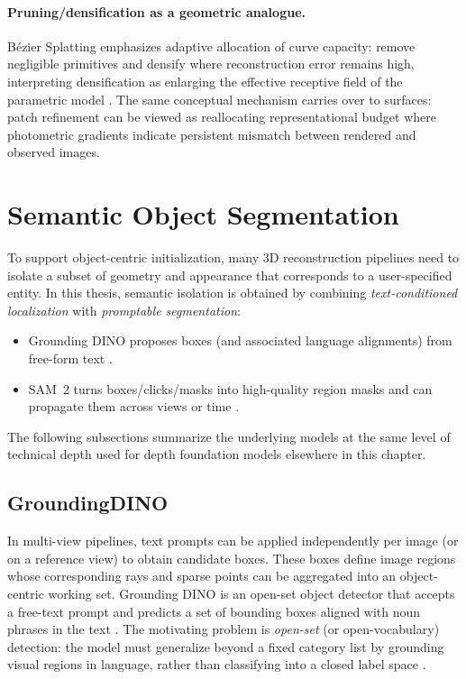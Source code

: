 \documentclass{report}
\begin{document}
\paragraph{Pruning/densification as a geometric analogue.}
B\'ezier Splatting emphasizes adaptive allocation of curve capacity: remove negligible primitives and densify where reconstruction error remains high, interpreting densification as enlarging the effective receptive field of the parametric model \cite{liu2025bezier}. The same conceptual mechanism carries over to surfaces: patch refinement can be viewed as reallocating representational budget where photometric gradients indicate persistent mismatch between rendered and observed images.

\section{Semantic Object Segmentation}
To support object-centric initialization, many 3D reconstruction pipelines need to isolate a subset of geometry and appearance that corresponds to a user-specified entity. In this thesis, semantic isolation is obtained by combining \emph{text-conditioned localization} with \emph{promptable segmentation}:
\begin{itemize}
    \item Grounding DINO proposes boxes (and associated language alignments) from free-form text \cite{liu2023groundingdino}.
    \item SAM~2 turns boxes/clicks/masks into high-quality region masks and can propagate them across views or time \cite{ravi2024sam2}.
\end{itemize}
The following subsections summarize the underlying models at the same level of technical depth used for depth foundation models elsewhere in this chapter.

\subsection{GroundingDINO}
In multi-view pipelines, text prompts can be applied independently per image (or on a reference view) to obtain candidate boxes. These boxes define image regions whose corresponding rays and sparse points can be aggregated into an object-centric working set. Grounding DINO is an open-set object detector that accepts a free-text prompt and predicts a set of bounding boxes aligned with noun phrases in the text \cite{liu2023groundingdino}. The motivating problem is \emph{open-set} (or open-vocabulary) detection: the model must generalize beyond a fixed category list by grounding visual regions in language, rather than classifying into a closed label space \cite{liu2023groundingdino}.
\end{document}
